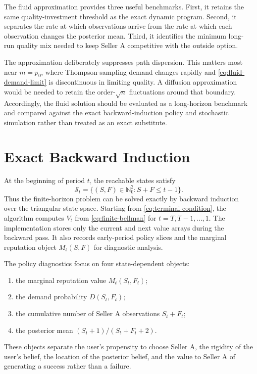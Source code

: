 \documentclass[opre]{informs3}
\newcommand{\Natu}{\mathbb{N}}
\newcommand{\State}{\mathcal{S}}
\begin{document}
The fluid approximation provides three useful benchmarks. First, it retains the
same quality-investment threshold as the exact dynamic program. Second, it
separates the rate at which observations arrive from the rate at which each
observation changes the posterior mean. Third, it identifies the minimum
long-run quality mix needed to keep Seller A competitive with the outside
option.

The approximation deliberately suppresses path dispersion. This matters most
near $m=p_0$, where Thompson-sampling demand changes rapidly and
\cref{eq:fluid-demand-limit} is discontinuous in limiting quality. A diffusion
approximation would be needed to retain the order-$\sqrt{n}$ fluctuations around
that boundary. Accordingly, the fluid solution should be evaluated as a
long-horizon benchmark and compared against the exact backward-induction policy
and stochastic simulation rather than treated as an exact substitute.

\section{Exact Backward Induction}

At the beginning of period $t$, the reachable states satisfy
\begin{equation}
    \State_t=\{(S,F)\in\Natu_0^2:S+F\leq t-1\}.
    \label{eq:reachable-state-space}
\end{equation}
Thus the finite-horizon problem can be solved exactly by backward induction over
the triangular state space. Starting from \cref{eq:terminal-condition}, the
algorithm computes $V_t$ from \cref{eq:finite-bellman} for
$t=T,T-1,\ldots,1$. The implementation stores only the current and next value
arrays during the backward pass. It also records early-period policy slices and
the marginal reputation object $M_t(S,F)$ for diagnostic analysis.

The policy diagnostics focus on four state-dependent objects:
\begin{enumerate}
    \item the marginal reputation value $M_t(S_t,F_t)$;
    \item the demand probability $D(S_t,F_t)$;
    \item the cumulative number of Seller A observations $S_t+F_t$;
    \item the posterior mean $(S_t+1)/(S_t+F_t+2)$.
\end{enumerate}
These objects separate the user's propensity to choose Seller A, the rigidity of
the user's belief, the location of the posterior belief, and the value to Seller
A of generating a success rather than a failure.
\end{document}
